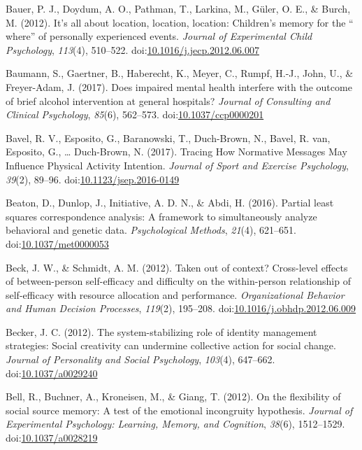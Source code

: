 \documentclass[english,man]{apa6}
\begin{document}
\hypertarget{ref-Bauer2012}{}
Bauer, P. J., Doydum, A. O., Pathman, T., Larkina, M., Güler, O. E., \&
Burch, M. (2012). It's all about location, location, location:
Children's memory for the `` where'' of personally experienced events.
\emph{Journal of Experimental Child Psychology}, \emph{113}(4),
510--522.
doi:\href{https://doi.org/10.1016/j.jecp.2012.06.007}{10.1016/j.jecp.2012.06.007}

\hypertarget{ref-Baumann2017}{}
Baumann, S., Gaertner, B., Haberecht, K., Meyer, C., Rumpf, H.-J., John,
U., \& Freyer-Adam, J. (2017). Does impaired mental health interfere
with the outcome of brief alcohol intervention at general hospitals?
\emph{Journal of Consulting and Clinical Psychology}, \emph{85}(6),
562--573.
doi:\href{https://doi.org/10.1037/ccp0000201}{10.1037/ccp0000201}

\hypertarget{ref-VanBavel2017}{}
Bavel, R. V., Esposito, G., Baranowski, T., Duch-Brown, N., Bavel, R.
van, Esposito, G., \ldots{} Duch-Brown, N. (2017). Tracing How Normative
Messages May Influence Physical Activity Intention. \emph{Journal of
Sport and Exercise Psychology}, \emph{39}(2), 89--96.
doi:\href{https://doi.org/10.1123/jsep.2016-0149}{10.1123/jsep.2016-0149}

\hypertarget{ref-Beaton2016}{}
Beaton, D., Dunlop, J., Initiative, A. D. N., \& Abdi, H. (2016).
Partial least squares correspondence analysis: A framework to
simultaneously analyze behavioral and genetic data. \emph{Psychological
Methods}, \emph{21}(4), 621--651.
doi:\href{https://doi.org/10.1037/met0000053}{10.1037/met0000053}

\hypertarget{ref-Beck2012}{}
Beck, J. W., \& Schmidt, A. M. (2012). Taken out of context? Cross-level
effects of between-person self-efficacy and difficulty on the
within-person relationship of self-efficacy with resource allocation and
performance. \emph{Organizational Behavior and Human Decision
Processes}, \emph{119}(2), 195--208.
doi:\href{https://doi.org/10.1016/j.obhdp.2012.06.009}{10.1016/j.obhdp.2012.06.009}

\hypertarget{ref-Becker2012}{}
Becker, J. C. (2012). The system-stabilizing role of identity management
strategies: Social creativity can undermine collective action for social
change. \emph{Journal of Personality and Social Psychology},
\emph{103}(4), 647--662.
doi:\href{https://doi.org/10.1037/a0029240}{10.1037/a0029240}

\hypertarget{ref-Bell2012}{}
Bell, R., Buchner, A., Kroneisen, M., \& Giang, T. (2012). On the
flexibility of social source memory: A test of the emotional incongruity
hypothesis. \emph{Journal of Experimental Psychology: Learning, Memory,
and Cognition}, \emph{38}(6), 1512--1529.
doi:\href{https://doi.org/10.1037/a0028219}{10.1037/a0028219}
\end{document}
